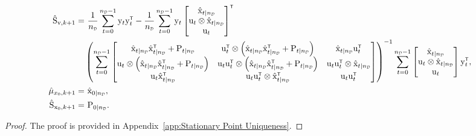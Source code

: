\begin{proposition}
\begin{align}
        \label{eq: closed form Sw}
        \\
        \hat{\mxS}_{\vcv,k+1}   =&\,\, \frac{1}{\nD}\sum_{t=0}^{\nD-1} \vcy_t  \vcy_t^\tr - \frac{1}{\nD}  \sum_{t=0}^{\nD-1} \vcy_t\begin{bmatrix} 
        \hat{\vcx}_{t|\nD}\\ \vcu_t \otimes \hat{\vcx}_{t|\nD} \\ \vcu_t\end{bmatrix}^\tr 
        \nonumber
        \\
        &\left(\sum_{t=0}^{\nD-1}
        \begin{bmatrix} 
        \hat{\vcx}_{t|\nD} \hat{\vcx}_{t|\nD}^\tr + \mxP_{t|\nD} 
        & \vcu_t^\tr \otimes \left(\hat{\vcx}_{t|\nD} \hat{\vcx}_{t|\nD}^\tr + \mxP_{t|\nD} \right) 
        & \hat{\vcx}_{t|\nD} \vcu_t^\tr \\ 
        \vcu_t \otimes \left(\hat{\vcx}_{t|\nD} \hat{\vcx}_{t|\nD}^\tr +    \mxP_{t|\nD} \right)
        & \vcu_t \vcu_t^\tr \otimes \left(\hat{\vcx}_{t|\nD} \hat{\vcx}_{t|\nD}^\tr     + \mxP_{t|\nD} \right)
        & \vcu_t\vcu_t^\tr \otimes \hat{\vcx}_{t|\nD}\\
        \vcu_t \hat{\vcx}_{t|\nD}^\tr 
        & \vcu_t \vcu_t^\tr \otimes \hat{\vcx}_{t|\nD}^\tr
        & \vcu_t \vcu_t^\tr 
        \end{bmatrix}\right)^{-1}
        \sum_{t=0}^{\nD-1} \begin{bmatrix} 
        \hat{\vcx}_{t|\nD}\\ \vcu_t \otimes \hat{\vcx}_{t|\nD} \\ \vcu_t\end{bmatrix} \vcy_t^\tr, 
        \label{eq: closed form Sv}\\
        \hat{\vcmu}_{x_0,k+1}   =&\,\, \hat{\vcx}_{0|\nD}, 
        \label{eq: closed form mux0}\\
        \hat{\mxS}_{\vcx_0,k+1}   =&\,\, \mxP_{0|\nD}. \label{eq: closed form Sx0} 
\end{align}
\end{proposition}
\begin{proof}
    The proof is provided in Appendix~\ref{app:Stationary Point Uniqueness}.
\end{proof}

